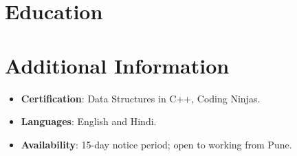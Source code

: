 \documentclass[11pt,a4paper,sans]{moderncv}
\begin{document}
\section{Education}
\vspace{1pt}


\section{Additional Information}
\vspace{1pt}
\begin{itemize}
\item {\textbf{Certification}: Data Structures in C++, Coding Ninjas.}
\item {\textbf{Languages}: English and Hindi.}
\item {\textbf{Availability}: 15-day notice period; open to working from Pune.}
\end{itemize}
\end{document}
